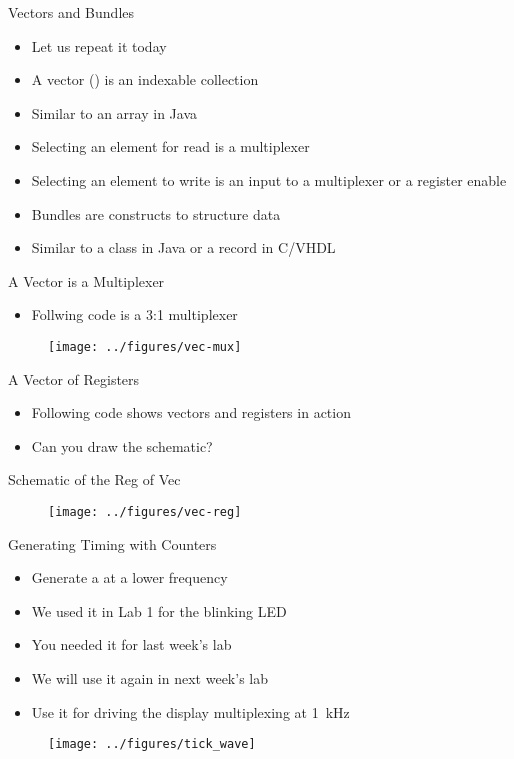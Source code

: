 \begin{frame}[fragile]{Vectors and Bundles}
\begin{itemize}
\item Let us repeat it today
\item A vector () is an indexable collection
\item Similar to an array in Java
\item Selecting an element for read is a multiplexer
\item Selecting an element to write is an input to a multiplexer or a register enable
\item Bundles are constructs to structure data
\item Similar to a class in Java or a record in C/VHDL
\end{itemize}
\end{frame}

\begin{frame}[fragile]{A Vector is a Multiplexer}
\begin{itemize}
\item Follwing code is a 3:1 multiplexer
\end{itemize}
\begin{figure}
  \texttt{[image: ../figures/vec-mux]}
\end{figure}
\end{frame}

\begin{frame}[fragile]{A Vector of Registers}
\begin{itemize}
\item Following code shows vectors and registers in action
\end{itemize}
\begin{itemize}
\item Can you draw the schematic?
\end{itemize}
\end{frame}

\begin{frame}[fragile]{Schematic of the Reg of Vec}
\begin{figure}
  \texttt{[image: ../figures/vec-reg]}
\end{figure}
\end{frame}

\begin{frame}[fragile]{Generating Timing with Counters}
\begin{itemize}
\item Generate a  at a lower frequency
\item We used it in Lab 1 for the blinking LED
\item You needed it for last week's lab
\item We will use it again in next week's lab
\item Use it for driving the display multiplexing at 1~kHz
\end{itemize}
\begin{figure}
  \texttt{[image: ../figures/tick\_wave]}
\end{figure}
\end{frame}



